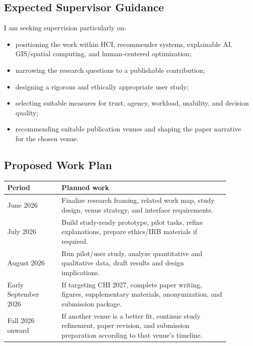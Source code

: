 \documentclass[11pt,a4paper]{article}
\begin{document}
\subsection*{Expected Supervisor Guidance}

\noindent I am seeking supervision particularly on:

\begin{itemize}
    \item positioning the work within HCI, recommender systems, explainable AI, GIS/spatial computing, and human-centered optimization;
    \item narrowing the research questions to a publishable contribution;
    \item designing a rigorous and ethically appropriate user study;
    \item selecting suitable measures for trust, agency, workload, usability, and decision quality;
    \item recommending suitable publication venues and shaping the paper narrative for the chosen venue.
\end{itemize}

\subsection*{Proposed Work Plan}

\begin{center}
\begin{tabular}{p{0.22\linewidth} p{0.68\linewidth}}
\hline
\textbf{Period} & \textbf{Planned work} \\
\hline
June 2026 & Finalize research framing, related work map, study design, venue strategy, and interface requirements. \\
July 2026 & Build study-ready prototype, pilot tasks, refine explanations, prepare ethics/IRB materials if required. \\
August 2026 & Run pilot/user study, analyze quantitative and qualitative data, draft results and design implications. \\
Early September 2026 & If targeting CHI 2027, complete paper writing, figures, supplementary materials, anonymization, and submission package. \\
Fall 2026 onward & If another venue is a better fit, continue study refinement, paper revision, and submission preparation according to that venue's timeline. \\
\hline
\end{tabular}
\end{center}
\end{document}
